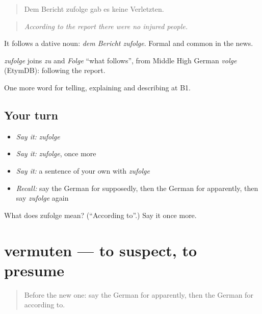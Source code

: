 \begin{quote}
Dem Bericht zufolge gab es keine Verletzten.
\end{quote}

\begin{quote}
\emph{According to the report there were no injured people.}
\end{quote}

It follows a dative noun: \emph{dem Bericht zufolge}. Formal and common in the news.

\begin{cousinweb}
\emph{zufolge} joins \emph{zu} and \emph{Folge} \textquotedblleft{}what follows\textquotedblright{}, from Middle High German \emph{volge} (EtymDB): following the report.
\end{cousinweb}

\begin{grammarlens}[title={What you've built}]
One more word for telling, explaining and describing at B1.
\end{grammarlens}

\subsection*{Your turn}
\begin{itemize}
\raggedright
  \item \emph{Say it:} \emph{zufolge}
  \item \emph{Say it:} \emph{zufolge}, once more
  \item \emph{Say it:} a sentence of your own with \emph{zufolge}
  \item \emph{Recall:} say the German for supposedly, then the German for apparently, then say \emph{zufolge} again
\end{itemize}

\begin{tcolorbox}[breakable,colback=teal!4,colframe=teal!35!black,title={Before you move on}]
What does zufolge mean? (\textquotedblleft{}According to\textquotedblright{}.) Say it once more.
\end{tcolorbox}
\section[vermuten]{vermuten — to suspect, to presume}

\label{lesson:GE-C275-vermuten}



\begin{quote}
Before the new one: say the German for apparently, then the German for according to.
\end{quote}

